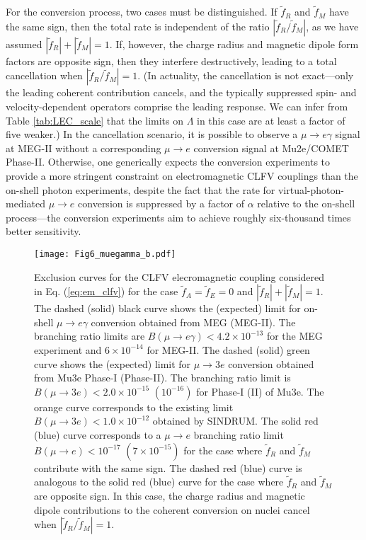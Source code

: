 \documentclass{book}[letterpaper,12pt]
\begin{document}
For the conversion process, two cases must be distinguished. If $\tilde{f}_R$ and $\tilde{f}_M$ have the same sign, then the total rate is independent of the ratio $|\tilde{f}_R/\tilde{f}_M|$, as we have assumed $|\tilde{f}_R|+|\tilde{f}_M|=1$. If, however, the charge radius and magnetic dipole form factors are opposite sign, then they interfere destructively, leading to a total cancellation when $|\tilde{f}_R/\tilde{f}_M|=1$. (In actuality, the cancellation is not exact---only the leading coherent contribution cancels, and the typically suppressed spin- and velocity-dependent operators comprise the leading response. We can infer from Table \ref{tab:LEC_scale} that the limits on $\Lambda$ in this case are at least a factor of five weaker.) In the cancellation scenario, it is possible to observe a $\mu\rightarrow e\gamma$ signal at MEG-II without a corresponding $\mu\rightarrow e$ conversion signal at Mu2e/COMET Phase-II. Otherwise, one generically expects the conversion experiments to provide a more stringent constraint on electromagnetic CLFV couplings than the on-shell photon experiments, despite the fact that the rate for virtual-photon-mediated $\mu\rightarrow e$ conversion is suppressed by a factor of $\alpha$ relative to the on-shell process---the conversion experiments aim to achieve roughly six-thousand times better sensitivity.

\begin{figure}
\centering
\texttt{[image: Fig6\_muegamma\_b.pdf]}
\caption{Exclusion curves for the CLFV elecromagnetic coupling considered in Eq. (\ref{eq:em_clfv}) for the case $\tilde{f}_A=\tilde{f}_E=0$ and $|\tilde{f}_R|+|\tilde{f}_M|=1$. The dashed (solid) black curve shows the (expected) limit for on-shell $\mu\rightarrow e\gamma$ conversion obtained from MEG (MEG-II). The branching ratio limits are $B(\mu\rightarrow e\gamma)<4.2\times 10^{-13}$ for the MEG experiment and $6\times 10^{-14}$ for MEG-II. The dashed (solid) green curve shows the (expected) limit for $\mu\rightarrow 3e$ conversion obtained from Mu3e Phase-I (Phase-II). The branching ratio limit is $B(\mu\rightarrow 3e)<2.0\times 10^{-15}$ $(10^{-16})$ for Phase-I (II)  of Mu3e. The orange curve corresponds to the existing limit $B(\mu\rightarrow 3e)<1.0\times 10^{-12}$ obtained by SINDRUM. The solid red (blue) curve corresponds to a $\mu\rightarrow e$ branching ratio limit $B(\mu\rightarrow e)<10^{-17}$ $(7\times 10^{-15})$ for the case where $\tilde{f}_R$ and $\tilde{f}_M$ contribute with the same sign. The dashed red (blue) curve is analogous to the solid red (blue) curve for the case where $\tilde{f}_R$ and $\tilde{f}_M$ are opposite sign. In this case, the charge radius and magnetic dipole contributions to the coherent conversion on nuclei cancel when $|\tilde{f}_R/\tilde{f}_M|=1$.}
\label{fig:mu2e_meg_mu3e}
\end{figure}
\end{document}
